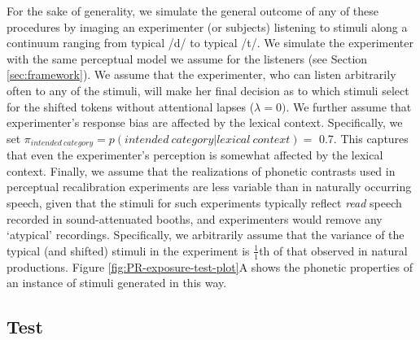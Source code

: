 \documentclass[
  11pt,
  man,floatsintext]{apa6}
\begin{document}
For the sake of generality, we simulate the general outcome of any of these procedures by imaging an experimenter (or subjects) listening to stimuli along a continuum ranging from typical /d/ to typical /t/. We simulate the experimenter with the same perceptual model we assume for the listeners (see Section \ref{sec:framework}). We assume that the experimenter, who can listen arbitrarily often to any of the stimuli, will make her final decision as to which stimuli select for the shifted tokens without attentional lapses (\(\lambda=0)\). We further assume that experimenter's response bias are affected by the lexical context. Specifically, we set \(\pi_{intended~category} = p(intended~category | lexical~context) =\) 0.7. This captures that even the experimenter's perception is somewhat affected by the lexical context. Finally, we assume that the realizations of phonetic contrasts used in perceptual recalibration experiments are less variable than in naturally occurring speech, given that the stimuli for such experiments typically reflect \emph{read} speech recorded in sound-attenuated booths, and experimenters would remove any `atypical' recordings. Specifically, we arbitrarily assume that the variance of the typical (and shifted) stimuli in the experiment is \(\frac{1}{1}\)th of that observed in natural productions. Figure \ref{fig:PR-exposure-test-plot}A shows the phonetic properties of an instance of stimuli generated in this way.

\hypertarget{test}{%
\subsection{Test}\label{test}}
\end{document}
